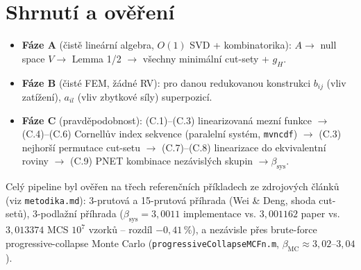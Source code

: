 \documentclass[11pt,a4paper]{article}
\newcommand{\code}[1]{\texttt{#1}}
\begin{document}
\section{Shrnutí a ověření}

\begin{itemize}
  \item \textbf{Fáze A} (čistě lineární algebra, $O(1)$ SVD + kombinatorika): $A\to$ null space
        $V\to$ Lemma 1/2 $\to$ všechny minimální cut-sety + $g_H$.
  \item \textbf{Fáze B} (čisté FEM, žádné RV): pro danou redukovanou konstrukci $b_{ij}$ (vliv
        zatížení), $a_{il}$ (vliv zbytkové síly) superpozicí.
  \item \textbf{Fáze C} (pravděpodobnost): (C.1)--(C.3) linearizovaná mezní funkce $\to$
        (C.4)--(C.6) Cornellův index sekvence (paralelní systém, \code{mvncdf}) $\to$ (C.3)
        nejhorší permutace cut-setu $\to$ (C.7)--(C.8) linearizace do ekvivalentní roviny $\to$
        (C.9) PNET kombinace nezávislých skupin $\to \beta_{\mathrm{sys}}$.
\end{itemize}

Celý pipeline byl ověřen na třech referenčních příkladech ze zdrojových článků (viz \code{metodika.md}):
3-prutová a 15-prutová příhrada (Wei \& Deng, shoda cut-setů), 3-podlažní příhrada
($\beta_{\mathrm{sys}}=3{,}0011$ implementace vs. $3{,}001162$ paper vs. $3{,}013374$ MCS $10^7$
vzorků -- rozdíl $-0{,}41\,\%$), a nezávisle přes brute-force progressive-collapse Monte Carlo
(\code{progressiveCollapseMCFn.m}, $\beta_{\mathrm{MC}}\approx3{,}02$--$3{,}04$).
\end{document}
